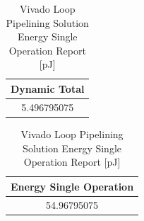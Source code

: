 \begin{table}[H]
    \centering
    \begin{minipage}[t]{0.45\linewidth}
        \centering
        \begin{tabular}{|c|}
            \hline
            \textbf{Dynamic Total} \\
            \hline
            5.496795075 \\
            \hline
        \end{tabular}
        \caption{Vivado Loop Pipelining Solution Dynamic Power Report [mW]}
        \label{tab:vivado-loop-pipelining-solution-dynamic-power-reproot}
    \end{minipage}
    \hfill
    \centering
    \begin{minipage}[t]{0.45\linewidth}
        \centering
        \begin{tabular}{|c|}
            \hline
            \textbf{Energy Single Operation} \\
            \hline
            54.96795075 \\
            \hline
        \end{tabular}
        \caption{Vivado Loop Pipelining Solution Energy Single Operation Report [pJ]}
        \label{tab:vivado-loop-pipelining-solution-energy-single-operation-reproot}
    \end{minipage}
\end{table}